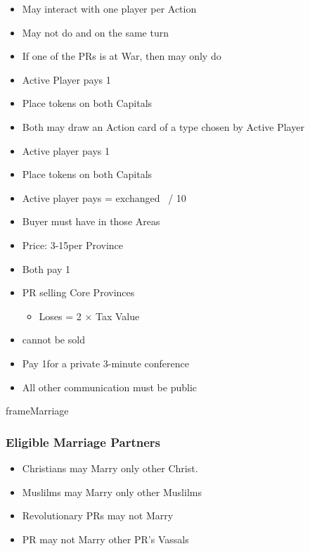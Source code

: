\documentclass[10pt]{article}
\begin{document}
\begin{itemize}
	\item May interact with one player per Action
	\item May not do  and  on the same turn
	\item If one of the PRs is at War, then may only do 
\end{itemize}
\begin{itemize}
	\item Active Player pays 1\diplopower
	\item Place \marriage tokens on both Capitals
	\item Both may draw an Action card of a type chosen by Active Player
\end{itemize}
\begin{itemize}
	\item Active player pays 1\diplopower
	\item Place \alliance tokens on both Capitals
\end{itemize}
\begin{itemize}
	\item Active player pays \diplopower = exchanged \ducats~/ 10
\end{itemize}
\begin{itemize}
	\item Buyer must have \claim in those Areas
	\item Price: 3-15\ducats per Province
	\item Both pay 1\adminpower
	\item PR selling Core Provinces
	\begin{itemize}
		\item Loses \prestige = 2 × Tax Value
	\end{itemize}
	\item \vassals cannot be sold
\end{itemize}
\begin{itemize}
	\item Pay 1\diplopower for a private 3-minute conference
	\item All other communication must be public
\end{itemize}
\begin{dynamiccontents*}{frameMarriage}
	\subsubsection*{Eligible Marriage Partners }
	\begin{itemize}
		\item Christians may Marry only other Christ.
		\item Muslilms may Marry only other Muslilms
		\item Revolutionary PRs may not Marry
		\item PR may not Marry other PR's Vassals
	\end{itemize}
\end{dynamiccontents*}
\end{document}
